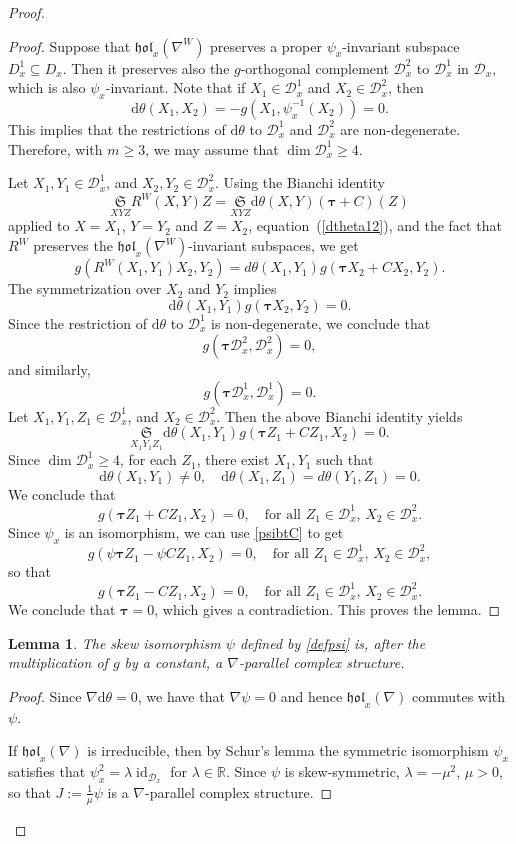 \documentclass{amsart}
\theoremstyle{plain}
\newtheorem{lem}[theorem]{Lemma}
\theoremstyle{definition}
\newcommand{\id}{\operatorname{id}}
\newcommand{\hol}{\mathfrak{hol}}
\newcommand{\bt}{{\boldsymbol{\tau}}}
\newcommand{\Real}{\mathbb{R}}
\newcommand{\Su}{\mathfrak{S}}
\newcommand{\1}{\mathbf{1}}
\newcommand{\D}{{\mathcal D}}
\renewcommand{\d}{\mathrm{d}}
\newcommand{\+}{\oplus}
\begin{document}
\begin{proof}
\begin{proof}
 Suppose that $\hol_x(\nabla^W)$ preserves a proper $\psi_x$-invariant subspace $D^1_x\subseteq D_x$. 
Then it preserves also the   $g$-orthogonal complement $\D^2_x$ to  $\D^1_x$ in $\D_x$, which is also   $\psi_x$-invariant.  Note that if $X_1\in \D^1_x$ and $X_2\in \D^2_x$, then 
\begin{equation}\label{dtheta12}
\d\theta(X_1,X_2)=-g(X_1,\psi_x^{-1}( X_2))=0.\end{equation}
 This implies that the restrictions of $\d\theta$ to $\D^1_x$ and $\D^2_x$ are non-degenerate.
 Therefore, with $m\ge 3$, we may assume that $\dim \D^1_x\geq 4$.

 Let $X_1,Y_1\in \D^1_x$, and $X_2,Y_2\in \D^2_x$.  Using the Bianchi identity 
 $$\underset{X Y Z}{\Su} R^{W}(X,Y)Z=\underset{X Y Z}{\Su} \d\theta(X,Y)(\bt+C) (Z)$$
 applied to $X=X_1$, $Y=Y_2$ and $Z=X_2$, equation~(\ref{dtheta12}),
 and the fact that $R^W$ preserves the $\hol_x(\nabla^W)$-invariant subspaces,  we get
$$g(R^W(X_1,Y_1)X_2,Y_2)=d\theta(X_1,Y_1)g(\bt X_2+C X_2,Y_2).$$
The symmetrization over $X_2$ and $Y_2$ implies
$$\d\theta(X_1,Y_1)g(\bt X_2,Y_2)=0.$$
Since the restriction of $\d\theta$ to $\D^1_x$ is non-degenerate, we conclude that
$$g(\bt \D^2_x,\D^2_x)=0,$$
and similarly,
$$g(\bt \D^1_x,\D^1_x)=0.$$
Let $X_1,Y_1,Z_1\in \D^1_x$, and $X_2\in \D^2_x$. Then the above Bianchi identity yields
$$ 
\underset{X_1 Y_1 Z_1}{\Su}\d\theta(X_1,Y_1)g(\bt Z_1+C Z_1,X_2)=0.
$$
Since $\dim \D^1_x\geq 4$, for each $Z_1$, there exist $X_1,Y_1$ such that $$\d\theta(X_1,Y_1)\neq 0,\quad \d\theta(X_1,Z_1)=d\theta(Y_1,Z_1)=0.$$
We conclude that $$g(\bt Z_1+C Z_1,X_2)=0,\quad \text{for all } Z_1\in \D^1_x,\,X_2\in \D^2_x.$$
Since $\psi_x$ is an isomorphism, we can use  \eqref{psibtC} to get
$$g(\psi \bt Z_1-\psi C Z_1,X_2)=0,\quad \text{for all } Z_1\in \D^1_x,\,X_2\in \D^2_x,$$
so that
$$g( \bt Z_1- C Z_1,X_2)=0,\quad \text{for all } Z_1\in \D^1_x,\,X_2\in \D^2_x.$$
We conclude that $\bt=0$, which gives a contradiction. This proves the lemma. \end{proof}

\begin{lem}\label{Jlem}
The skew isomorphism  $\psi$ defined by \eqref{defpsi} is, after the multiplication of $g$ by a constant, a $\nabla$-parallel complex structure.
\end{lem}
\begin{proof}
Since $\nabla\d\theta=0$, we have that $\nabla\psi=0$ and hence $\hol_x(\nabla) $ commutes with $\psi$.

If $\hol_x(\nabla)$ is  irreducible, then by Schur's lemma the symmetric isomorphism $\psi_x$ satisfies that $\psi^2_x=\lambda\id_{\D_x}$ for $\lambda\in \Real$. Since $\psi$ is skew-symmetric, $\lambda=-\mu^2$, $\mu>0$, so that $J:=\tfrac{1}{\mu} \psi$ is a $\nabla$-parallel complex structure. 


\end{proof}
\end{proof}
\end{document}
